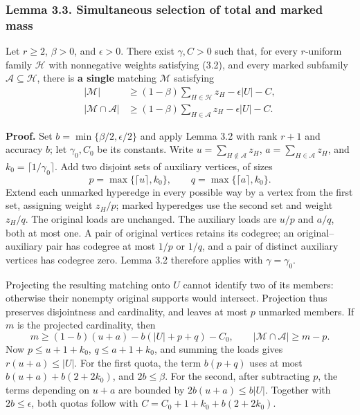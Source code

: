 \documentclass[english,11pt,a4paper]{article}
\newcounter{none}
\begin{document}
\subsubsection{Lemma 3.3. Simultaneous selection of total and marked mass}\label{lemma-3.3.-simultaneous-selection-of-total-and-marked-mass}

Let \(r\ge2\), \(\beta>0\), and \(\epsilon>0\). There exist \(\gamma,C>0\) such that, for every \(r\)-uniform family \(\mathcal H\) with nonnegative weights satisfying (3.2), and every marked subfamily \(\mathcal A\subseteq\mathcal H\), there is \textbf{a single} matching \(\mathcal M\) satisfying \[
\begin{aligned}
|\mathcal M|&\ge(1-\beta)\sum_{H\in\mathcal H}z_H-\epsilon|U|-C,\\
|\mathcal M\cap\mathcal A|&\ge(1-\beta)\sum_{H\in\mathcal A}z_H-\epsilon|U|-C.
\end{aligned}
\tag{3.4}
\]

\textbf{Proof.} Set \(b=\min\{\beta/2,\epsilon/2\}\) and apply Lemma 3.2 with rank \(r+1\) and accuracy \(b\); let \(\gamma_0,C_0\) be its constants. Write \(u=\sum_{H\notin\mathcal A}z_H\), \(a=\sum_{H\in\mathcal A}z_H\), and \(k_0=\lceil1/\gamma_0\rceil\). Add two disjoint sets of auxiliary vertices, of sizes \[
p=\max\{\lceil u\rceil,k_0\},\qquad
q=\max\{\lceil a\rceil,k_0\}.
\] Extend each unmarked hyperedge in every possible way by a vertex from the first set, assigning weight \(z_H/p\); marked hyperedges use the second set and weight \(z_H/q\). The original loads are unchanged. The auxiliary loads are \(u/p\) and \(a/q\), both at most one. A pair of original vertices retains its codegree; an original--auxiliary pair has codegree at most \(1/p\) or \(1/q\), and a pair of distinct auxiliary vertices has codegree zero. Lemma 3.2 therefore applies with \(\gamma=\gamma_0\).

Projecting the resulting matching onto \(U\) cannot identify two of its members: otherwise their nonempty original supports would intersect. Projection thus preserves disjointness and cardinality, and leaves at most \(p\) unmarked members. If \(m\) is the projected cardinality, then \[
m\ge(1-b)(u+a)-b(|U|+p+q)-C_0,
\qquad |\mathcal M\cap\mathcal A|\ge m-p.
\] Now \(p\le u+1+k_0\), \(q\le a+1+k_0\), and summing the loads gives \(r(u+a)\le|U|\). For the first quota, the term \(b(p+q)\) uses at most \(b(u+a)+b(2+2k_0)\), and \(2b\le\beta\). For the second, after subtracting \(p\), the terms depending on \(u+a\) are bounded by \(2b(u+a)\le b|U|\). Together with \(2b\le\epsilon\), both quotas follow with \(C=C_0+1+k_0+b(2+2k_0)\).
\end{document}
